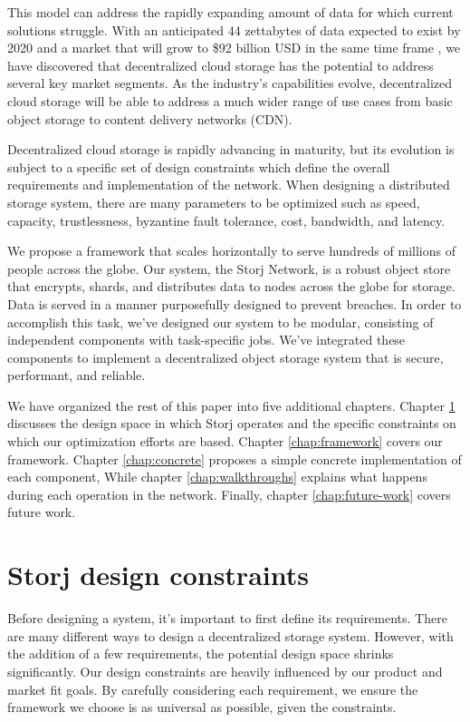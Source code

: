 \documentclass[11pt,fleqn,openany]{book}
\begin{document}
This model can address the rapidly
expanding amount of data for which current solutions struggle.
With an anticipated 44 zettabytes of data expected to exist by 2020 and a
market that will grow to \$92 billion USD in the same time frame
\cite{storage-growth}, we have discovered that decentralized cloud storage
has the potential to address several key market segments.
As the industry's capabilities evolve, decentralized cloud
storage will be able to address a much wider range of use cases from basic
object storage to content delivery networks (CDN).

Decentralized cloud storage is rapidly advancing in maturity, but its evolution
is subject to a specific set of design constraints which
define the overall requirements and implementation of
the network. When designing a distributed storage system,
there are many parameters to be optimized such as speed, capacity,
trustlessness, byzantine fault tolerance, cost, bandwidth, and latency.

We propose a framework that scales horizontally to serve hundreds of millions of
people across the globe. Our system, the Storj Network, is a robust object store
that encrypts, shards, and distributes data to nodes across the globe for
storage.
Data is served in a manner purposefully designed to prevent
breaches.
In order to accomplish this task, we've designed our system to be modular,
consisting of independent components with task-specific jobs.
We've integrated these components to implement a decentralized object storage
system that is secure, performant, and reliable.

We have organized the rest of this paper into five additional
chapters. Chapter \ref{chap:design-constraints} discusses the design space
in which Storj operates and the specific constraints on which
our optimization efforts are based.
Chapter \ref{chap:framework} covers our framework. Chapter
\ref{chap:concrete}
proposes a simple concrete implementation of each component,
While chapter \ref{chap:walkthroughs} explains what happens
during each operation in the network. Finally, chapter
\ref{chap:future-work} covers future work.

\chapter{Storj design constraints}\label{chap:design-constraints}

Before designing a system, it's important to first define its requirements.
There are many different ways to design a decentralized storage system. However,
with the addition of a few requirements, the potential design space shrinks
significantly.
Our design constraints are heavily influenced by our product and
market fit goals.
By carefully considering each requirement, we ensure the framework
we choose is as universal as possible, given the constraints.
\end{document}
